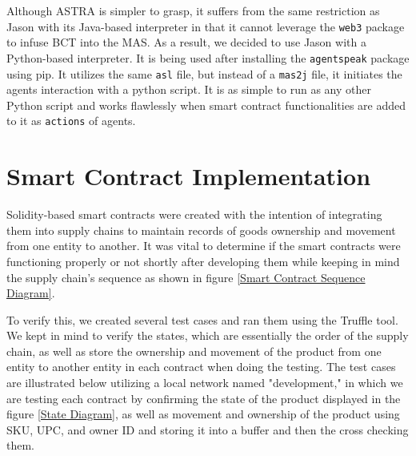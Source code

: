 \vspace{.5cm}

Although ASTRA is simpler to grasp, it suffers from the same restriction as Jason with its Java-based interpreter in that it cannot leverage the \texttt{web3} package to infuse \ac{BCT} into the \ac{MAS}. As a result, we decided to use Jason with a Python-based interpreter. It is being used after installing the \texttt{agentspeak} package using \ac{pip}. It utilizes the same \texttt{asl} file, but instead of a \texttt{mas2j} file, it initiates the agents interaction with a python script. It is as simple to run as any other Python script and works flawlessly when smart contract functionalities are added to it as \texttt{actions} of agents.

\section{Smart Contract Implementation }

Solidity-based smart contracts were created with the intention of integrating them into supply chains to maintain records of goods ownership and movement from one entity to another. It was vital to determine if the smart contracts were functioning properly or not shortly after developing them while keeping in mind the supply chain's sequence as shown in figure \ref{Smart Contract Sequence Diagram}. 

\vspace{.5cm}

To verify this, we created several test cases and ran them using the Truffle tool. We kept in mind to verify the states, which are essentially the order of the supply chain, as well as store the ownership and movement of the product from one entity to another entity in each contract when doing the testing. The test cases are illustrated below utilizing a local network named "development," in which we are testing each contract by confirming the state of the product displayed in the figure \ref{State Diagram}, as well as movement and ownership of the product using \ac{SKU}, \ac{UPC}, and owner ID and storing it into a buffer and then the cross checking them.

\vspace{.5cm}

